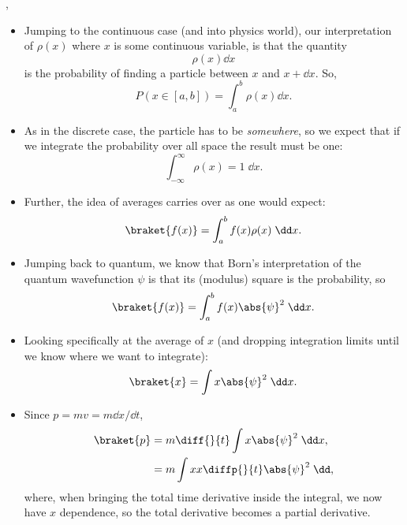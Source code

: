 \sep


\begin{itemize}
    \item Jumping to the continuous case (and into physics world), our interpretation of $\rho(x)$ where $x$ is some continuous variable, is that the quantity
        \begin{equation}
            \rho(x) \dd x
        \end{equation}
        is the probability of finding a particle between $x$ and $x+\dd x$. So, 
        \begin{equation}
            P(x \in [a,b]) = \int_a^b \rho(x) \dd x.
        \end{equation}
    \item As in the discrete case, the particle has to be \textit{somewhere}, so we expect that if we integrate the probability over all space the result must be one:
        \begin{equation}
            \int_{-\infty}^{\infty} \rho(x) = 1 \;\dd x.
        \end{equation}
    \item Further, the idea of averages carries over as one would expect:
        \begin{equation}
            \braket{f(x)} = \int_a^b f(x)\rho(x) \;\dd x.
        \end{equation}
    \item Jumping back to quantum, we know that Born's interpretation of the quantum wavefunction $\psi$ is that its (modulus) square is the probability, so
        \begin{equation}
            \braket{f(x)} = \int_a^b f(x) \abs{\psi}^2 \;\dd x.
        \end{equation}
    \item Looking specifically at the average of $x$ (and dropping integration limits until we know where we want to integrate):
        \begin{equation}
            \braket{x} = \int x\abs{\psi}^2 \;\dd x.
        \end{equation}
    \item Since $p=mv = m\dd x/\dd t$, 
        \begin{align*}
            \braket{p} &= m\diff{}{t} \int x\abs{\psi}^2 \;\dd x, \\
            &= m\int x x\diffp{}{t}\abs{\psi}^2 \;\dd,
        \end{align*}
        where, when bringing the total time derivative inside the integral, we now have $x$ dependence, so the total derivative becomes a partial derivative.

\end{itemize}
